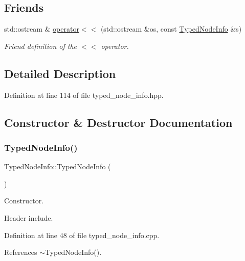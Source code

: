 \subsection*{Friends}
\begin{DoxyCompactItemize}
\item 
std\+::ostream \& \hyperlink{structTypedNodeInfo_a44b5e6659c6a4881d73f29eb5debbf6f}{operator$<$$<$} (std\+::ostream \&os, const \hyperlink{structTypedNodeInfo}{Typed\+Node\+Info} \&s)
\begin{DoxyCompactList}\small\item\em Friend definition of the $<$$<$ operator. \end{DoxyCompactList}\end{DoxyCompactItemize}


\subsection{Detailed Description}


Definition at line 114 of file typed\+\_\+node\+\_\+info.\+hpp.



\subsection{Constructor \& Destructor Documentation}
\mbox{\label{structTypedNodeInfo_a274ac58a99402be306cd888541f935c8}} 
\subsubsection{\texorpdfstring{Typed\+Node\+Info()}{TypedNodeInfo()}}
{\footnotesize\ttfamily Typed\+Node\+Info\+::\+Typed\+Node\+Info (\begin{DoxyParamCaption}{ }\end{DoxyParamCaption})}



Constructor. 

Header include. 

Definition at line 48 of file typed\+\_\+node\+\_\+info.\+cpp.



References $\sim$\+Typed\+Node\+Info().

